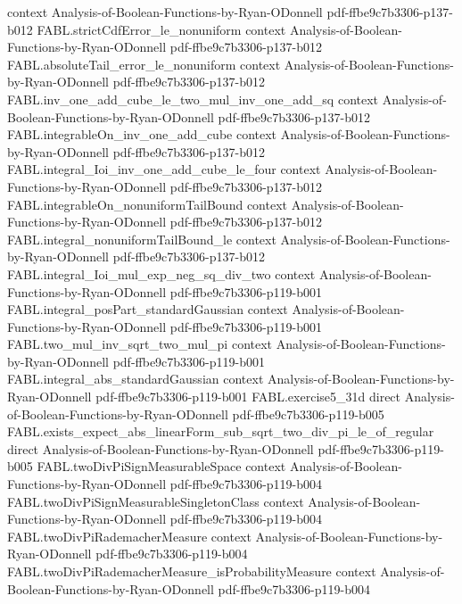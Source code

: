 \begin{theorem}
  {context}
  {Analysis-of-Boolean-Functions-by-Ryan-ODonnell}
  {pdf-ffbe9c7b3306-p137-b012}
\proofstep
  {FABL.strictCdfError_le_nonuniform}
  {context}
  {Analysis-of-Boolean-Functions-by-Ryan-ODonnell}
  {pdf-ffbe9c7b3306-p137-b012}
\proofstep
  {FABL.absoluteTail_error_le_nonuniform}
  {context}
  {Analysis-of-Boolean-Functions-by-Ryan-ODonnell}
  {pdf-ffbe9c7b3306-p137-b012}
\proofstep
  {FABL.inv_one_add_cube_le_two_mul_inv_one_add_sq}
  {context}
  {Analysis-of-Boolean-Functions-by-Ryan-ODonnell}
  {pdf-ffbe9c7b3306-p137-b012}
\proofstep
  {FABL.integrableOn_inv_one_add_cube}
  {context}
  {Analysis-of-Boolean-Functions-by-Ryan-ODonnell}
  {pdf-ffbe9c7b3306-p137-b012}
\proofstep
  {FABL.integral_Ioi_inv_one_add_cube_le_four}
  {context}
  {Analysis-of-Boolean-Functions-by-Ryan-ODonnell}
  {pdf-ffbe9c7b3306-p137-b012}
\proofstep
  {FABL.integrableOn_nonuniformTailBound}
  {context}
  {Analysis-of-Boolean-Functions-by-Ryan-ODonnell}
  {pdf-ffbe9c7b3306-p137-b012}
\proofstep
  {FABL.integral_nonuniformTailBound_le}
  {context}
  {Analysis-of-Boolean-Functions-by-Ryan-ODonnell}
  {pdf-ffbe9c7b3306-p137-b012}
\proofstep
  {FABL.integral_Ioi_mul_exp_neg_sq_div_two}
  {context}
  {Analysis-of-Boolean-Functions-by-Ryan-ODonnell}
  {pdf-ffbe9c7b3306-p119-b001}
\proofstep
  {FABL.integral_posPart_standardGaussian}
  {context}
  {Analysis-of-Boolean-Functions-by-Ryan-ODonnell}
  {pdf-ffbe9c7b3306-p119-b001}
\proofstep
  {FABL.two_mul_inv_sqrt_two_mul_pi}
  {context}
  {Analysis-of-Boolean-Functions-by-Ryan-ODonnell}
  {pdf-ffbe9c7b3306-p119-b001}
\proofstep
  {FABL.integral_abs_standardGaussian}
  {context}
  {Analysis-of-Boolean-Functions-by-Ryan-ODonnell}
  {pdf-ffbe9c7b3306-p119-b001}
\proofstep
  {FABL.exercise5_31d}
  {direct}
  {Analysis-of-Boolean-Functions-by-Ryan-ODonnell}
  {pdf-ffbe9c7b3306-p119-b005}
\proofstep
  {FABL.exists_expect_abs_linearForm_sub_sqrt_two_div_pi_le_of_regular}
  {direct}
  {Analysis-of-Boolean-Functions-by-Ryan-ODonnell}
  {pdf-ffbe9c7b3306-p119-b005}
\proofstep
  {FABL.twoDivPiSignMeasurableSpace}
  {context}
  {Analysis-of-Boolean-Functions-by-Ryan-ODonnell}
  {pdf-ffbe9c7b3306-p119-b004}
\proofstep
  {FABL.twoDivPiSignMeasurableSingletonClass}
  {context}
  {Analysis-of-Boolean-Functions-by-Ryan-ODonnell}
  {pdf-ffbe9c7b3306-p119-b004}
\proofstep
  {FABL.twoDivPiRademacherMeasure}
  {context}
  {Analysis-of-Boolean-Functions-by-Ryan-ODonnell}
  {pdf-ffbe9c7b3306-p119-b004}
\proofstep
  {FABL.twoDivPiRademacherMeasure_isProbabilityMeasure}
  {context}
  {Analysis-of-Boolean-Functions-by-Ryan-ODonnell}
  {pdf-ffbe9c7b3306-p119-b004}

\end{theorem}
